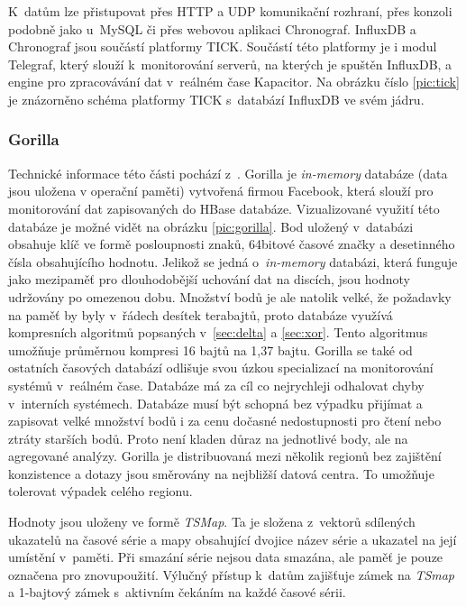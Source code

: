 K~datům lze přistupovat přes HTTP a UDP komunikační rozhraní, přes konzoli podobně jako u~MySQL či přes webovou aplikaci Chronograf. InfluxDB a Chronograf jsou součástí platformy TICK. Součástí této platformy je i modul Telegraf, který slouží k~monitorování serverů, na kterých je spuštěn InfluxDB, a engine pro zpracovávání dat v~reálném čase Kapacitor. 
Na obrázku číslo \ref{pic:tick} je znázorněno schéma platformy TICK s~databází InfluxDB ve svém jádru.

\subsubsection*{Gorilla} \label{sec:gorilla}
Technické informace této části pochází z~\cite{gorilla}. Gorilla je \textit{in-memory} databáze (data jsou uložena v operační paměti) vytvořená firmou Facebook, která slouží pro monitorování dat zapisovaných do HBase databáze. Vizualizované využití této databáze je možné vidět na obrázku \ref{pic:gorilla}. Bod uložený v~databázi obsahuje klíč ve formě posloupnosti znaků, 64bitové časové značky a desetinného čísla obsahujícího hodnotu. Jelikož se jedná o~\textit{in-memory} databázi, která funguje jako mezipaměť pro dlouhodobější uchování dat na discích, jsou hodnoty udržovány po omezenou dobu. Množství bodů je ale natolik velké, že požadavky na paměť by byly v~řádech desítek terabajtů, proto databáze využívá kompresních algoritmů popsaných v~\ref{sec:delta} a \ref{sec:xor}. Tento algoritmus umožňuje průměrnou kompresi 16 bajtů na 1,37 bajtu. Gorilla se také od ostatních časových databází odlišuje svou úzkou specializací na monitorování systémů v~reálném čase. Databáze má za cíl co nejrychleji odhalovat chyby v~interních systémech. Databáze musí být schopná bez výpadku přijímat a zapisovat velké množství bodů i za cenu dočasné nedostupnosti pro čtení nebo ztráty starších bodů. Proto není kladen důraz na jednotlivé body, ale na agregované analýzy. Gorilla je distribuovaná mezi několik regionů bez zajištění konzistence a dotazy jsou směrovány na nejbližší datová centra. To umožňuje tolerovat výpadek celého regionu.

Hodnoty jsou uloženy ve formě \textit{TSMap}. Ta je složena z~vektorů sdílených ukazatelů na časové série a mapy obsahující dvojice název série a ukazatel na její umístění v~paměti. Při smazání série nejsou data smazána, ale paměť je pouze označena pro znovupoužití. Výlučný přístup k~datům zajišťuje zámek na \textit{TSmap} a 1-bajtový zámek s~aktivním čekáním na každé časové sérii.

